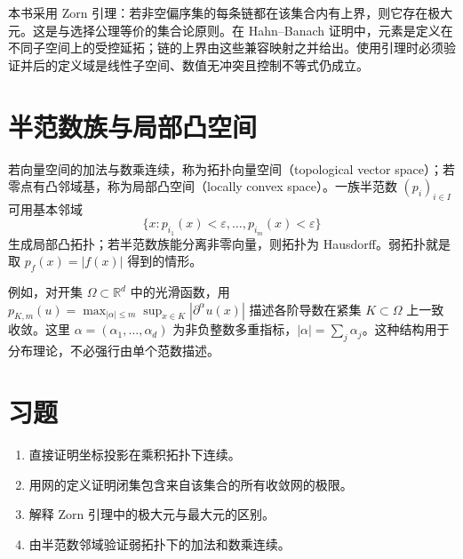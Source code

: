 本书采用 Zorn 引理：若非空偏序集的每条链都在该集合内有上界，则它存在极大元。这是与选择公理等价的集合论原则。在 Hahn--Banach 证明中，元素是定义在不同子空间上的受控延拓；链的上界由这些兼容映射之并给出。使用引理时必须验证并后的定义域是线性子空间、数值无冲突且控制不等式仍成立。

\section{半范数族与局部凸空间}
若向量空间的加法与数乘连续，称为拓扑向量空间（topological vector space）；若零点有凸邻域基，称为局部凸空间（locally convex space）。一族半范数 $(p_i)_{i\in I}$ 可用基本邻域
\[
 \{x:p_{i_1}(x)<\varepsilon,\ldots,p_{i_m}(x)<\varepsilon\}
\]
生成局部凸拓扑；若半范数族能分离非零向量，则拓扑为 Hausdorff。弱拓扑就是取 $p_f(x)=|f(x)|$ 得到的情形。

例如，对开集 $\Omega\subset\mathbb R^d$ 中的光滑函数，用 $p_{K,m}(u)=\max_{|\alpha|\leq m}\sup_{x\in K}|\partial^\alpha u(x)|$ 描述各阶导数在紧集 $K\subset\Omega$ 上一致收敛。这里 $\alpha=(\alpha_1,\ldots,\alpha_d)$ 为非负整数多重指标，$|\alpha|=\sum_j\alpha_j$。这种结构用于分布理论，不必强行由单个范数描述。

\section{习题}
\begin{enumerate}
 \item 直接证明坐标投影在乘积拓扑下连续。
 \item 用网的定义证明闭集包含来自该集合的所有收敛网的极限。
 \item 解释 Zorn 引理中的极大元与最大元的区别。
 \item 由半范数邻域验证弱拓扑下的加法和数乘连续。
\end{enumerate}

